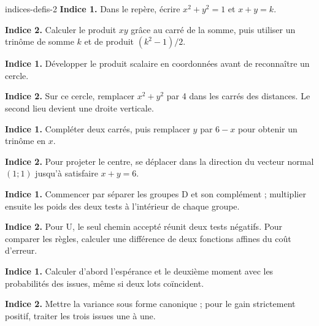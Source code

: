 \begin{blocEdition}{indices-defis-2}
\textbf{Indice 1.} Dans le repère, écrire $x^2+y^2=1$ et $x+y=k$.\par\smallskip
\textbf{Indice 2.} Calculer le produit $xy$ grâce au carré de la somme, puis utiliser un trinôme de somme $k$ et de produit $(k^2-1)/2$.\par\smallskip
{}
\textbf{Indice 1.} Développer le produit scalaire en coordonnées avant de reconnaître un cercle.\par\smallskip
\textbf{Indice 2.} Sur ce cercle, remplacer $x^2+y^2$ par 4 dans les carrés des distances. Le second lieu devient une droite verticale.\par\smallskip
{}
\textbf{Indice 1.} Compléter deux carrés, puis remplacer $y$ par $6-x$ pour obtenir un trinôme en $x$.\par\smallskip
\textbf{Indice 2.} Pour projeter le centre, se déplacer dans la direction du vecteur normal $(1;1)$ jusqu'à satisfaire $x+y=6$.\par\smallskip
{}
\textbf{Indice 1.} Commencer par séparer les groupes D et son complément ; multiplier ensuite les poids des deux tests à l'intérieur de chaque groupe.\par\smallskip
\textbf{Indice 2.} Pour U, le seul chemin accepté réunit deux tests négatifs. Pour comparer les règles, calculer une différence de deux fonctions affines du coût d'erreur.\par\smallskip
{}
\textbf{Indice 1.} Calculer d'abord l'espérance et le deuxième moment avec les probabilités des issues, même si deux lots coïncident.\par\smallskip
\textbf{Indice 2.} Mettre la variance sous forme canonique ; pour le gain strictement positif, traiter les trois issues une à une.\par\smallskip
\end{blocEdition}

